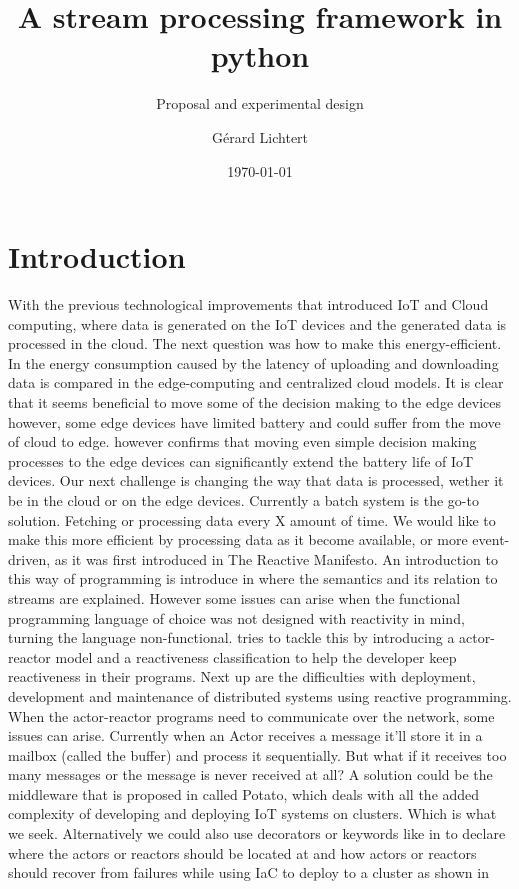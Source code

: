 \documentclass[a4paper]{article}
\title{A stream processing framework in python}
\subtitle{Proposal and experimental design}
\author{Gérard Lichtert}
\date{\today}
\begin{document}
\maketitle

\section*{Introduction}
With the previous technological improvements that introduced IoT and Cloud computing, where data is generated on the IoT devices and the generated data is processed in the cloud. The next question was how to make this energy-efficient. In \cite{edgevscloud} the energy consumption caused by the latency of uploading and downloading data is compared in the edge-computing and centralized cloud models. It is clear that it seems beneficial to move some of the decision making to the edge devices however, some edge devices have limited battery and could suffer from the move of cloud to edge. \cite{edgeoniot} however confirms that moving even simple decision making processes to the edge devices can significantly extend the battery life of IoT devices. \newline\newline
Our next challenge is changing the way that data is processed, wether it be in the cloud or on the edge devices. Currently a batch system is the go-to solution. Fetching or processing data every X amount of time. We would like to make this more efficient by processing data as it become available, or more event-driven, as it was first introduced in \cite{reactmanifesto} The Reactive Manifesto. An introduction to this way of programming is introduce in \cite{FRP} where the semantics and its relation to streams are explained. However some issues can arise when the functional programming language of choice was not designed with reactivity in mind, turning the language non-functional. \cite{TacklingtheAwkwardSquad} tries to tackle this by introducing a actor-reactor model and a reactiveness classification to help the developer keep reactiveness in their programs. \newline\newline
Next up are the difficulties with deployment, development and maintenance of distributed systems using reactive programming. When the actor-reactor programs need to communicate over the network, some issues can arise. Currently when an Actor receives a message it'll store it in a mailbox (called the buffer) and process it sequentially. But what if it receives too many messages or the message is never received at all? A solution could be the middleware that is proposed in \cite{BuildIoT} called Potato, which deals with all the added complexity of developing and deploying IoT systems on clusters. Which is what we seek. Alternatively we could also use decorators or keywords like in \cite{ScalaLoci} to declare where the actors or reactors should be located at and how actors or reactors should recover from failures while using IaC to deploy to a cluster as shown in \cite{IaC}\newline\newline
\end{document}
